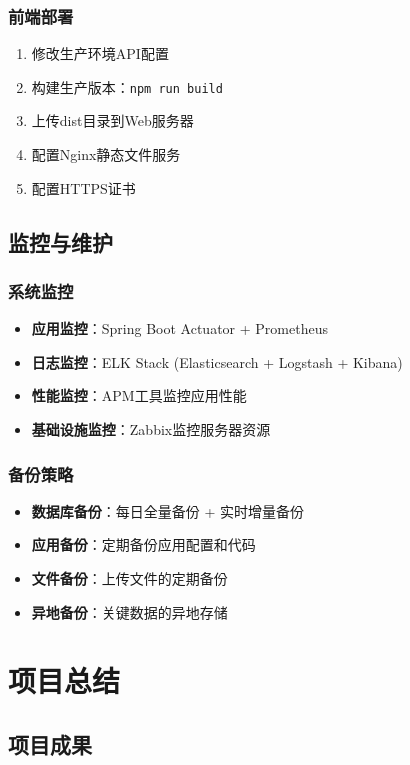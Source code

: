 \documentclass[12pt,a4paper]{article}
\begin{document}
\subsubsection{前端部署}
\begin{enumerate}
    \item 修改生产环境API配置
    \item 构建生产版本：\texttt{npm run build}
    \item 上传dist目录到Web服务器
    \item 配置Nginx静态文件服务
    \item 配置HTTPS证书
\end{enumerate}

\subsection{监控与维护}

\subsubsection{系统监控}
\begin{itemize}
    \item \textbf{应用监控}：Spring Boot Actuator + Prometheus
    \item \textbf{日志监控}：ELK Stack (Elasticsearch + Logstash + Kibana)
    \item \textbf{性能监控}：APM工具监控应用性能
    \item \textbf{基础设施监控}：Zabbix监控服务器资源
\end{itemize}

\subsubsection{备份策略}
\begin{itemize}
    \item \textbf{数据库备份}：每日全量备份 + 实时增量备份
    \item \textbf{应用备份}：定期备份应用配置和代码
    \item \textbf{文件备份}：上传文件的定期备份
    \item \textbf{异地备份}：关键数据的异地存储
\end{itemize}

\section{项目总结}

\subsection{项目成果}
\end{document}
